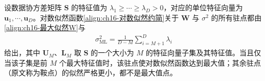 \documentclass[../../main.tex]{subfiles}
\begin{document}
\begin{theorem}\label{theorem:ch16-最大似然解}
设数据协方差矩阵 $\bm{S}$ 的特征值为 $\lambda_1\geqslant\cdots\geqslant\lambda_D>0$，对应的单位特征向量为 $\bm{u}_1,\cdots,\bm{u}_D$。对数似然函数\eqref{align:ch16-对数似然约简}关于 $\bm{W}$ 与 $\sigma^2$ 的所有驻点都由\eqref{align:ch16-最大似然W}与
\begin{align}
  \sigma^2_{\text{ML}}=\frac{1}{D-M}\sum_{i=M+1}^{D}\lambda_i
  \label{align:ch16-最大似然sigma}
\end{align}
给出，其中 $\bm{U}_M$、$\bm{L}_M$ 取 $\bm{S}$ 的一个大小为 $M$ 的特征向量子集及其特征值。当且仅当该子集是前 $M$ 个最大特征值时，该驻点使对数似然函数达到最大值；其余驻点（原文称为鞍点）的似然严格更小，都不是最大值点。
\end{theorem}
\end{document}
